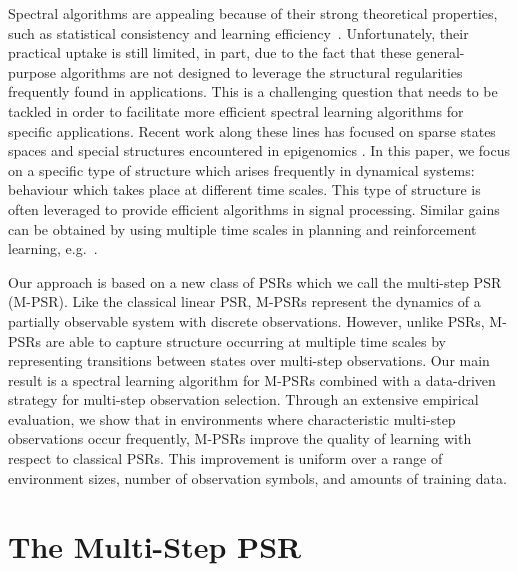 \documentclass[letterpaper]{article}
\begin{document}
Spectral algorithms are appealing because of their strong theoretical properties, such as statistical consistency and learning efficiency~\cite{hsu09,bailly10}. Unfortunately, their practical uptake is still limited, in part, due to the fact that these general-purpose algorithms are not designed to leverage the structural regularities frequently found in applications. This is a challenging question that needs to be tackled in order to facilitate more efficient spectral learning algorithms for specific applications. Recent work along these lines has focused on sparse states spaces \cite{Hamilton2013} and special structures encountered in epigenomics \cite{zhang2015spectral}. In this paper, we focus on a specific type of structure which arises frequently in dynamical systems: behaviour which takes place at different time scales. This type of structure is often leveraged to provide efficient algorithms in signal processing. Similar gains can be obtained by using multiple time scales in planning and reinforcement learning, e.g.~\cite{sutton99}.

Our approach is based on a new class of PSRs which we call the multi-step PSR (M-PSR). Like the classical linear PSR, M-PSRs represent the dynamics of a partially observable system with discrete observations. However, unlike PSRs, M-PSRs are able to capture structure occurring at multiple time scales by representing transitions between states over multi-step observations. Our main result is a spectral learning algorithm for M-PSRs combined with a data-driven strategy for multi-step observation selection. Through an extensive empirical evaluation, we show that in environments where characteristic multi-step observations occur frequently, M-PSRs improve the quality of learning with respect to classical PSRs. This improvement is uniform over a range of environment sizes, number of observation symbols, and amounts of training data. 

\section{The Multi-Step PSR}
\end{document}
